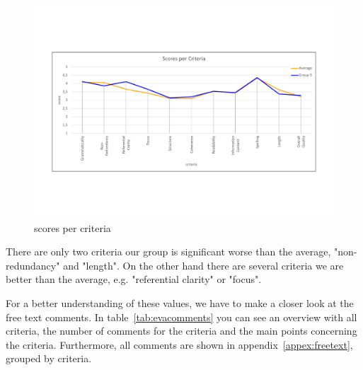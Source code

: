 \begin{figure}[H]
	\centering
	\includegraphics[trim=0 150 0 150, width=\textwidth]{img/scores_per_criteria.pdf}
	\caption{scores per criteria}
	\label{fig:spc}
\end{figure}

There are only two criteria our group is significant worse than the average, "non-redundancy" and "length". On the other hand there are several criteria we are better than the average, e.g. "referential clarity" or "focus".

For a better understanding of these values, we have to make a closer look at the free text comments.
In table~\ref{tab:evacomments} you can see an overview with all criteria, the number of comments for the criteria and the main points concerning the criteria. Furthermore, all comments are shown in appendix~\ref{appex:freetext}, grouped by criteria.

